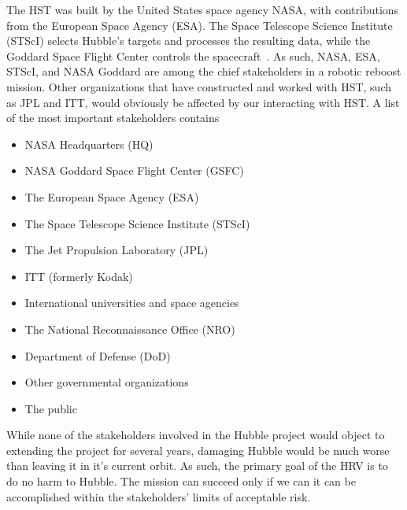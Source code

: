 \documentclass[paper=letter, fontsize=11pt]{scrartcl} %
\numberwithin{equation}{section} %
\numberwithin{figure}{section} %
\numberwithin{table}{section} %
\begin{document}
The HST was built by the United States space agency NASA, with contributions from the European Space Agency (ESA). The Space Telescope Science Institute (STScI) selects Hubble's targets and processes the resulting data, while the Goddard Space Flight Center controls the spacecraft~\cite{hubble_essentials}. As such, NASA, ESA, STScI, and NASA Goddard are among the chief stakeholders in a robotic reboost mission. Other organizations that have constructed and worked with HST, such as JPL and ITT, would obviously be affected by our interacting with HST. A list of the most important stakeholders contains
\begin{itemize}
\setlength\itemsep{0em}
\item NASA Headquarters (HQ)
\item NASA Goddard Space Flight Center (GSFC)
\item The European Space Agency (ESA)
\item The Space Telescope Science Institute (STScI)
\item The Jet Propulsion Laboratory (JPL)
\item ITT (formerly Kodak)
\item International universities and space agencies
\item The National Reconnaissance Office (NRO)
\item Department of Defense (DoD)
\item Other governmental organizations
\item The public
\end{itemize}

While none of the stakeholders involved in the Hubble project would object to extending the project for several years, damaging Hubble would be much worse than leaving it in it's current orbit. As such, the primary goal of the HRV is to do no harm to Hubble. The mission can succeed only if we can it can be accomplished within the stakeholders' limits of acceptable risk.
\end{document}
